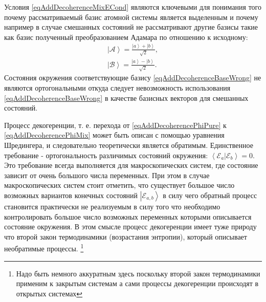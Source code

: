 Условия \eqref{eqAddDecoherenceMixECond} являются ключевыми для
понимания того почему рассматриваемый базис атомной системы является
выделенным и почему например в случае смешанных состояний не
рассматривают другие базисы такие как базис полученный преобразованием
Адамара по отношению к исходному:
\begin{eqnarray}
\left|\mathcal{A}\right> = \frac{\left|a\right> + \left|b\right>}
              {\sqrt{2}},
\nonumber \\
\left|\mathcal{B}\right> = \frac{\left|a\right> - \left|b\right>}
              {\sqrt{2}}.
\label{eqAddDecoherenceBaseWrong}
\end{eqnarray}
Состояния окружения соответствующие базису
\eqref{eqAddDecoherenceBaseWrong} не являются ортогональными откуда
следует невозможность использования \eqref{eqAddDecoherenceBaseWrong}
в качестве базисных векторов для смешанных состояний. 

Процесс декогеренции, т. е. перехода от
\eqref{eqAddDecoherencePhiPure} к \eqref{eqAddDecoherencePhiMix} может
быть описан с помощью уравнения Шредингера, и следовательно
теоретически является обратимым. Единственное требование -
ортогональность различимых состояний окружения: 
$\left<\mathcal{E}_a\right.\left|\mathcal{E}_b\right> = 0$. Это
требование всегда выполняется для макроскопических систем, где
состояние зависит от очень большого числа переменных. При этом в
случае макроскопических систем стоит отметить, что существует большое
число возможных вариантов конечных состояний
$\left|\mathcal{E}_{a,b}\right>$ 
в силу чего обратный процесс становится практически не реализуемым в
силу того что необходимо контролировать большое число возможных
переменных которыми описывается состояние окружения. В этом смысле
процесс декогеренции имеет туже природу что второй закон термодинамики 
(возрастания энтропии), который описывает
необратимые процессы.
\footnote{Надо быть немного аккуратным здесь
  поскольку второй закон термодинамики применим к закрытым системам а
  сами процессы декогеренции происходят в открытых системах}


